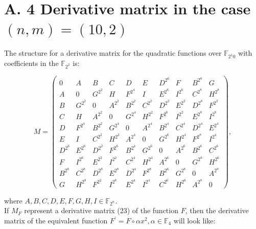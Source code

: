\documentclass[10pt]{article}
\begin{document}
\section*{A. 4 Derivative matrix in the case $(n, m)=(10,2)$}
The structure for a derivative matrix for the quadratic functions over $\mathbb{F}_{2^{1} 0}$ with coefficients in the $\mathbb{F}_{2^{2}}$ is:

\[
M=\left(\begin{array}{cccccccccc}
0 & A & B & C & D & E & D^{2^{6}} & F & B^{2^{8}} & G  \tag{23}\\
A & 0 & G^{2^{2}} & H & F^{2^{4}} & I & E^{2^{6}} & I^{2^{6}} & C^{2^{8}} & H^{2^{8}} \\
B & G^{2^{2}} & 0 & A^{2^{2}} & B^{2^{2}} & C^{2^{2}} & D^{2^{2}} & E^{2^{2}} & D^{2^{8}} & F^{2^{2}} \\
C & H & A^{2^{2}} & 0 & G^{2^{4}} & H^{2^{2}} & F^{2^{6}} & I^{2^{2}} & E^{2^{8}} & I^{2^{8}} \\
D & F^{2^{4}} & B^{2^{2}} & G^{2^{4}} & 0 & A^{2^{4}} & B^{2^{4}} & C^{2^{4}} & D^{2^{4}} & E^{2^{4}} \\
E & I & C^{2^{2}} & H^{2^{2}} & A^{2^{4}} & 0 & G^{2^{6}} & H^{2^{4}} & F^{2^{8}} & I^{2^{4}} \\
D^{2^{6}} & E^{2^{6}} & D^{2^{2}} & F^{2^{6}} & B^{2^{4}} & G^{2^{6}} & 0 & A^{2^{6}} & B^{2^{6}} & C^{2^{6}} \\
F & I^{2^{6}} & E^{2^{2}} & I^{2^{2}} & C^{2^{4}} & H^{2^{4}} & A^{2^{6}} & 0 & G^{2^{8}} & H^{2^{6}} \\
B^{2^{8}} & C^{2^{8}} & D^{2^{8}} & E^{2^{8}} & D^{2^{4}} & F^{2^{8}} & B^{2^{6}} & G^{2^{8}} & 0 & A^{2^{8}} \\
G & H^{2^{8}} & F^{2^{2}} & I^{2^{8}} & E^{2^{4}} & I^{2^{4}} & C^{2^{6}} & H^{2^{6}} & A^{2^{8}} & 0
\end{array}\right),
\]

where $A, B, C, D, E, F, G, H, I \in \mathbb{F}_{2^{n}}$.\\
If $M_{F}$ represent a derivative matrix (23) of the function $F$, then the derivative matrix of the equivalent function $F^{\prime}=F \circ \alpha x^{2}, \alpha \in \mathbb{F}_{4}$ will look like:
\end{document}
